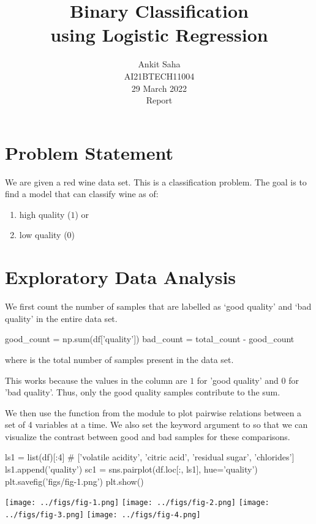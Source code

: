 \documentclass[journal,12pt,onecolumn]{IEEEtran}
\title{Binary Classification \\using Logistic Regression}
\author{Ankit Saha \\ \normalsize AI21BTECH11004 \\ \vspace*{20pt} \normalsize  29 March 2022 \\ \vspace*{20pt} \Large  Report}
\begin{document}
	\maketitle
	
	\section{Problem Statement}
	We are given a red wine data set. This is a classification problem. The goal is to find a model that can classify wine as of:
	\begin{enumerate}
		\item high quality ($1$) or
		\item low quality ($0$)
	\end{enumerate}
			
	\section{Exploratory Data Analysis}
	We first count the number of samples that are labelled as `good quality' and `bad quality' in the entire data set.
	\begin{python}
	good_count = np.sum(df['quality'])
	bad_count = total_count - good_count \end{python}
	where  is the total number of samples present in the data set.
	
	This works because the values in the  column are $1$ for 'good quality' and $0$ for 'bad quality'. Thus, only the good quality samples contribute to the sum.
	
	\vspace*{20pt}
	We then use the  function from the  module to plot pairwise relations between a set of 4 variables at a time. We also set the keyword argument  to  so that we can visualize the contrast between good and bad samples for these comparisons.
	\begin{python}
	ls1 = list(df)[:4] # ['volatile acidity', 'citric acid', 'residual sugar', 'chlorides']
	ls1.append('quality')
	sc1 = sns.pairplot(df.loc[:, ls1], hue='quality')
	plt.savefig('figs/fig-1.png')
	plt.show() \end{python}
	
	\texttt{[image: ../figs/fig-1.png]}
	\texttt{[image: ../figs/fig-2.png]}
	\texttt{[image: ../figs/fig-3.png]}
	\texttt{[image: ../figs/fig-4.png]}
	
\end{document}
